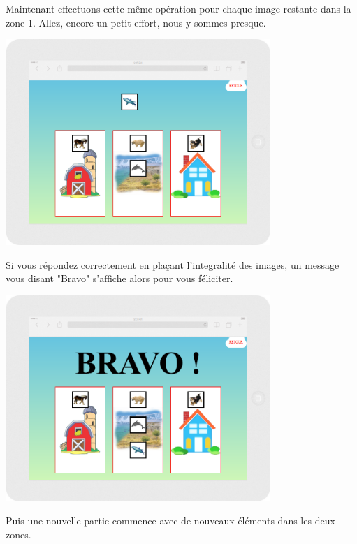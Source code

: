 \documentclass{article}
\begin{document}
\vspace{0.5cm}
Maintenant effectuons cette même opération pour chaque image restante dans la zone 1. Allez, encore un petit effort, nous y sommes presque.
\vspace{0.5cm}\\
\begin{center}
\includegraphics[width=0.75\textwidth]{zone5}
\end{center}
\vspace{0.5cm}
Si vous répondez correctement en pla\c{c}ant l'integralité des images, un message vous disant "Bravo" s'affiche alors pour vous féliciter.
\vspace{0.5cm}\\
\begin{center}
\includegraphics[width=0.75\textwidth]{zone6}
\end{center}
\vspace{0.5cm}
Puis une nouvelle partie commence avec de nouveaux éléments dans les deux zones.
\vspace{0.5cm}\\
\end{document}
